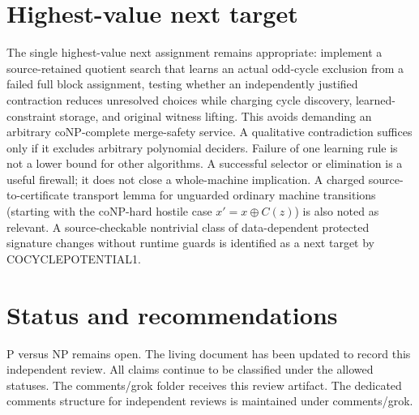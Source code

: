 \documentclass[11pt]{article}
\begin{document}
\section{Highest-value next target}
The single highest-value next assignment remains appropriate: implement a source-retained quotient search that learns an actual odd-cycle exclusion from a failed full block assignment, testing whether an independently justified contraction reduces unresolved choices while charging cycle discovery, learned-constraint storage, and original witness lifting. This avoids demanding an arbitrary coNP-complete merge-safety service. A qualitative contradiction suffices only if it excludes arbitrary polynomial deciders. Failure of one learning rule is not a lower bound for other algorithms. A successful selector or elimination is a useful firewall; it does not close a whole-machine implication. A charged source-to-certificate transport lemma for unguarded ordinary machine transitions (starting with the coNP-hard hostile case $x'=x\oplus C(z)$) is also noted as relevant. A source-checkable nontrivial class of data-dependent protected signature changes without runtime guards is identified as a next target by COCYCLEPOTENTIAL1.

\section{Status and recommendations}
P versus NP remains open. The living document has been updated to record this independent review. All claims continue to be classified under the allowed statuses. The comments/grok folder receives this review artifact. The dedicated comments structure for independent reviews is maintained under comments/grok.

\end{document}
